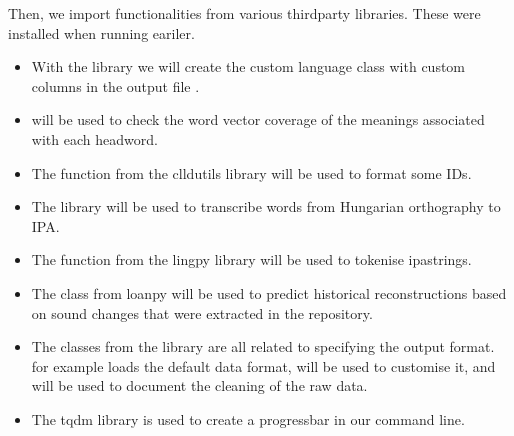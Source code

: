 \documentclass[letterpaper,10pt,english]{sphinxmanual}
\begin{document}
\sphinxAtStartPar
Then, we import functionalities from various third\sphinxhyphen{}party libraries.
These were installed when running 
eariler.
\begin{itemize}
\item {} 
\sphinxAtStartPar
With the  library
we will create the custom language class with custom columns in the output
file .

\item {} 
\sphinxAtStartPar
{} will be used to check the word
vector coverage of the meanings associated with each headword.

\item {} 
\sphinxAtStartPar
The 
function from the clldutils library will be used to format some IDs.

\item {} 
\sphinxAtStartPar
The  library will be used to
transcribe words from Hungarian orthography to IPA.

\item {} 
\sphinxAtStartPar
The 
function from the lingpy library will be used to tokenise ipa\sphinxhyphen{}strings.

\item {} 
\sphinxAtStartPar
The 
class from loanpy will be used to predict historical
reconstructions based on sound changes that were extracted in the
repository.

\item {} 
\sphinxAtStartPar
The classes from the 
library are all related to specifying the output format.  for
example
loads the default data format,  will be used to customise it, and
 will be used to document the cleaning of the raw data.

\item {} 
\sphinxAtStartPar
The tqdm library is used to create a progressbar in our command line.

\end{itemize}
\end{document}
